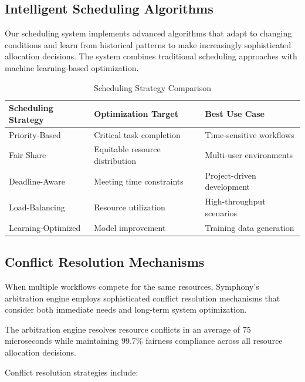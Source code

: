 \subsection*{Intelligent Scheduling Algorithms}

Our scheduling system implements advanced algorithms that adapt to changing conditions and learn from historical patterns to make increasingly sophisticated allocation decisions. The system combines traditional scheduling approaches with machine learning-based optimization.

\begin{table}[ht]
\centering
\begin{tabular}{@{}lll@{}}
\toprule
\textbf{Scheduling Strategy} & \textbf{Optimization Target} & \textbf{Best Use Case} \\
\midrule
Priority-Based & Critical task completion & Time-sensitive workflows \\
Fair Share & Equitable resource distribution & Multi-user environments \\
Deadline-Aware & Meeting time constraints & Project-driven development \\
Load-Balancing & Resource utilization & High-throughput scenarios \\
Learning-Optimized & Model improvement & Training data generation \\
\bottomrule
\end{tabular}
\caption{Scheduling Strategy Comparison}
\end{table}

\subsection*{Conflict Resolution Mechanisms}

When multiple workflows compete for the same resources, Symphony's arbitration engine employs sophisticated conflict resolution mechanisms that consider both immediate needs and long-term system optimization.

\begin{alertbox}
The arbitration engine resolves resource conflicts in an average of 75 microseconds while maintaining 99.7\% fairness compliance across all resource allocation decisions.
\end{alertbox}

Conflict resolution strategies include:

